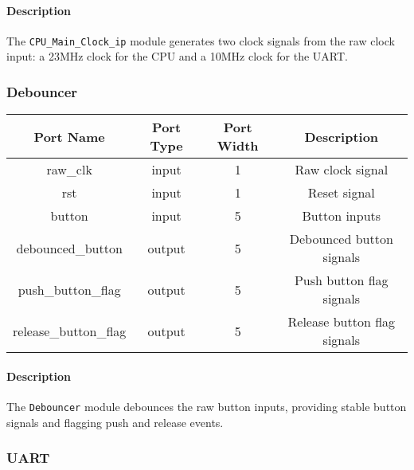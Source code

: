 \documentclass[a4paper,12pt]{article}
\begin{document}
\paragraph{Description}
The \texttt{CPU\_Main\_Clock\_ip} module generates two clock signals from the raw clock input: a 23MHz clock for the CPU and a 10MHz clock for the UART.

\subsubsection{Debouncer}

\begin{center}
    \begin{tabular}{cccc}
        \toprule
        \textbf{Port Name} & \textbf{Port Type} & \textbf{Port Width} & \textbf{Description} \\
        \midrule
        raw\_clk                & input  & 1 & Raw clock signal \\
        rst                     & input  & 1 & Reset signal \\
        button                  & input  & 5 & Button inputs \\
        debounced\_button       & output & 5 & Debounced button signals \\
        push\_button\_flag      & output & 5 & Push button flag signals \\
        release\_button\_flag   & output & 5 & Release button flag signals \\
        \bottomrule
    \end{tabular}
\end{center}


\paragraph{Description}
The \texttt{Debouncer} module debounces the raw button inputs, providing stable button signals and flagging push and release events.

\subsubsection{UART}
\end{document}
